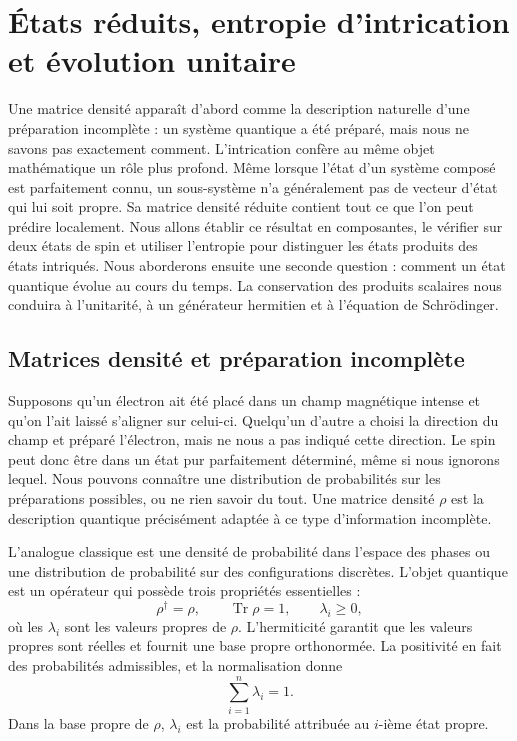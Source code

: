 \chapter{États réduits, entropie d’intrication et évolution unitaire}

Une matrice densité apparaît d’abord comme la description naturelle d’une préparation incomplète : un système quantique a été préparé, mais nous ne savons pas exactement comment. L’intrication confère au même objet mathématique un rôle plus profond. Même lorsque l’état d’un système composé est parfaitement connu, un sous-système n’a généralement pas de vecteur d’état qui lui soit propre. Sa matrice densité réduite contient tout ce que l’on peut prédire localement. Nous allons établir ce résultat en composantes, le vérifier sur deux états de spin et utiliser l’entropie pour distinguer les états produits des états intriqués. Nous aborderons ensuite une seconde question : comment un état quantique évolue au cours du temps. La conservation des produits scalaires nous conduira à l’unitarité, à un générateur hermitien et à l’équation de Schr\"odinger.

\section{Matrices densité et préparation incomplète}

Supposons qu’un électron ait été placé dans un champ magnétique intense et qu’on l’ait laissé s’aligner sur celui-ci. Quelqu’un d’autre a choisi la direction du champ et préparé l’électron, mais ne nous a pas indiqué cette direction. Le spin peut donc être dans un état pur parfaitement déterminé, même si nous ignorons lequel. Nous pouvons connaître une distribution de probabilités sur les préparations possibles, ou ne rien savoir du tout. Une matrice densité \(\rho\) est la description quantique précisément adaptée à ce type d’information incomplète.

L’analogue classique est une densité de probabilité dans l’espace des phases ou une distribution de probabilité sur des configurations discrètes. L’objet quantique est un opérateur qui possède trois propriétés essentielles :
\begin{equation}
\rho^\dagger=\rho,
\qquad
\operatorname{Tr}\rho=1,
\qquad
\lambda_i\geq 0,
\end{equation}
où les \(\lambda_i\) sont les valeurs propres de \(\rho\). L’hermiticité garantit que les valeurs propres sont réelles et fournit une base propre orthonormée. La positivité en fait des probabilités admissibles, et la normalisation donne
\begin{equation}
\sum_{i=1}^{n}\lambda_i=1.
\end{equation}
Dans la base propre de \(\rho\), \(\lambda_i\) est la probabilité attribuée au \(i\)-ième état propre.

